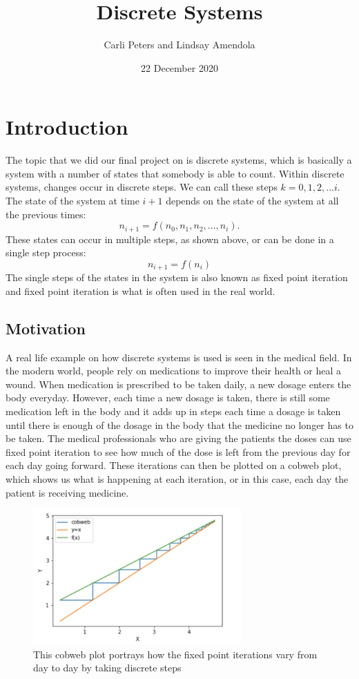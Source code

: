 \documentclass{article}
\title{Discrete Systems}
\author{Carli Peters and Lindsay Amendola}
\date{22 December 2020}
\begin{document}
\maketitle

\section{Introduction}
The topic that we did our final project on is discrete systems, which is basically a system with a number of states that somebody is able to count. Within discrete systems, changes occur in discrete steps. We can call these steps $k = 0,1,2,...i.$ The state of the system at time $i+1$ depends on the state of the system at all the previous times:
$$
n_{i+1}=f(n_0,n_1,n_2,...,n_i).
$$
These states can occur in multiple steps, as shown above, or can be done in a single step process:
$$
n_{i+1}=f(n_i)
$$
The single steps of the states in the system is also known as fixed point iteration and fixed point iteration is what is often used in the real world.
\subsection{Motivation}
A real life example on how discrete systems is used is seen in the medical field. In the modern world, people rely on medications to improve their health or heal a wound. When medication is prescribed to be taken daily, a new dosage enters the body everyday. However, each time a new dosage is taken, there is still some medication left in the body and it adds up in steps each time a dosage is taken until there is enough of the dosage in the body that the medicine no longer has to be taken. The medical professionals who are giving the patients the doses can use fixed point iteration to see how much of the dose is left from the previous day for each day going forward. These iterations can then be plotted on a cobweb plot, which shows us what is happening at each iteration, or in this case, each day the patient is receiving medicine. 
\begin{figure}
    \centering
    \includegraphics[width=8cm]{cobweb.png}
    \caption{This cobweb plot portrays how the fixed point iterations vary from day to day by taking discrete steps}
    \label{fig:Cobweb Plot for Medication Use}
\end{figure}
\end{document}
